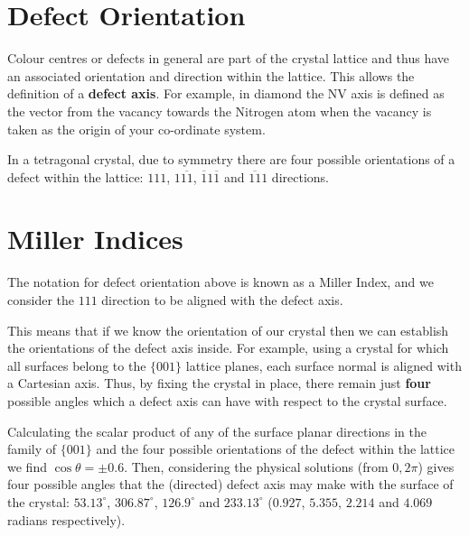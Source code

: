 \section{Defect Orientation}

Colour centres or defects in general are part of the crystal lattice and thus have an associated orientation and direction within the lattice. This allows the definition of a \textbf{defect axis}. For example, in diamond the NV axis is defined as the vector from the vacancy towards the Nitrogen atom when the vacancy is taken as the origin of your co-ordinate system. 

In a tetragonal crystal, due to symmetry there are four possible orientations of a defect within the lattice: $111$, $1\overline{11}$, $\overline{1}1\overline{1}$ and $\overline{11}1$ directions. 

\section{Miller Indices}
The notation for defect orientation above is known as a Miller Index, and we consider the $111$ direction to be aligned with the defect axis. 

This means that if we know the orientation of our crystal then we can establish the orientations of the defect axis inside. For example, using a crystal for which all surfaces belong to the $\{001\}$ lattice planes, each surface normal is aligned with a Cartesian axis. Thus, by fixing the crystal in place, there remain just \textbf{four} possible angles which a defect axis can have with respect to the crystal surface.

Calculating the scalar product of any of the surface planar directions in the family of $\{001\}$ and the four possible orientations of the defect within the lattice we find $\cos\theta = \pm0.6$. Then, considering the physical solutions (from $0, 2\pi$) gives four possible angles that the (directed) defect axis may make with the surface of the crystal: $53.13^\circ$, $306.87^\circ$, $126.9^\circ$ and $233.13^\circ$ ($0.927$, $5.355$, $2.214$ and $4.069$ radians respectively). 






    

